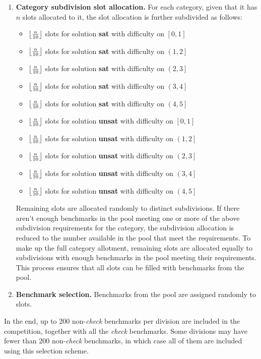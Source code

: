 \documentclass[12pt]{article}
\begin{document}
\begin{enumerate}
\item\textbf{Category subdivision slot allocation.} %
  For each category, given that it has $n$ slots allocated to it,
  the slot allocation is further subdivided as follows:
%
  \begin{itemize}
  \item $\left\lfloor n\over10\right\rfloor$ slots for solution \textbf{sat} with difficulty on $\left[0,1\right]$
  \item $\left\lfloor n\over10\right\rfloor$ slots for solution \textbf{sat} with difficulty on $\left(1,2\right]$
  \item $\left\lfloor n\over10\right\rfloor$ slots for solution \textbf{sat} with difficulty on $\left(2,3\right]$
  \item $\left\lfloor n\over10\right\rfloor$ slots for solution \textbf{sat} with difficulty on $\left(3,4\right]$
  \item $\left\lfloor n\over10\right\rfloor$ slots for solution \textbf{sat} with difficulty on $\left(4,5\right]$
  \item $\left\lfloor n\over10\right\rfloor$ slots for solution \textbf{unsat} with difficulty on $\left[0,1\right]$
  \item $\left\lfloor n\over10\right\rfloor$ slots for solution \textbf{unsat} with difficulty on $\left(1,2\right]$
  \item $\left\lfloor n\over10\right\rfloor$ slots for solution \textbf{unsat} with difficulty on $\left(2,3\right]$
  \item $\left\lfloor n\over10\right\rfloor$ slots for solution \textbf{unsat} with difficulty on $\left(3,4\right]$
  \item $\left\lfloor n\over10\right\rfloor$ slots for solution \textbf{unsat} with difficulty on $\left(4,5\right]$
  \end{itemize}
%
  Remaining slots are allocated randomly to distinct subdivisions.
  If there aren't enough benchmarks in the pool meeting one or more of
  the above subdivision requirements for the category, the subdivision
  allocation is reduced to the number available in the pool that meet
  the requirements.  To make up the full category allotment, remaining
  slots are allocated equally to subdivisions with enough benchmarks
  in the pool meeting their requirements.  This process ensures that
  all slots can be filled with benchmarks from the pool.

\item\textbf{Benchmark selection.} %
  Benchmarks from the pool are assigned randomly to slots.
\end{enumerate}
%
In the end, up to 200 non-\emph{check} benchmarks per division are
included in the competition, together with all the \emph{check}
benchmarks.  Some divisions may have fewer than 200 non-\emph{check}
benchmarks, in which case all of them are included using this selection
scheme.
\end{document}
